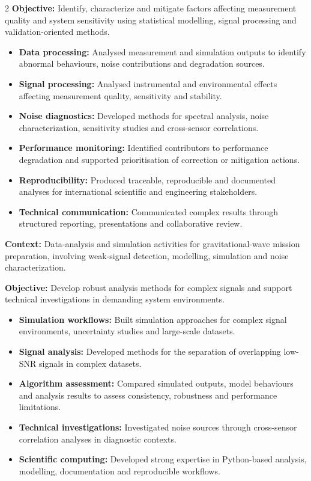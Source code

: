 \documentclass[8pt,a4paper,ragged2e,withhyper]{altacv}
\begin{document}
\begin{paracol}{2}
\textbf{Objective:} Identify, characterize and mitigate factors affecting measurement quality and system sensitivity using statistical modelling, signal processing and validation-oriented methods.

\begin{itemize}
  \item \textbf{Data processing:} Analysed measurement and simulation outputs to identify abnormal behaviours, noise contributions and degradation sources.
  \item \textbf{Signal processing:} Analysed instrumental and environmental effects affecting measurement quality, sensitivity and stability.
  \item \textbf{Noise diagnostics:} Developed methods for spectral analysis, noise characterization, sensitivity studies and cross-sensor correlations.
  \item \textbf{Performance monitoring:} Identified contributors to performance degradation and supported prioritisation of correction or mitigation actions.
  \item \textbf{Reproducibility:} Produced traceable, reproducible and documented analyses for international scientific and engineering stakeholders.
  \item \textbf{Technical communication:} Communicated complex results through structured reporting, presentations and collaborative review.
\end{itemize}

\divider


\textbf{Context:} Data-analysis and simulation activities for gravitational-wave mission preparation, involving weak-signal detection, modelling, simulation and noise characterization.

\textbf{Objective:} Develop robust analysis methods for complex signals and support technical investigations in demanding system environments.

\begin{itemize}
  \item \textbf{Simulation workflows:} Built simulation approaches for complex signal environments, uncertainty studies and large-scale datasets.
  \item \textbf{Signal analysis:} Developed methods for the separation of overlapping low-SNR signals in complex datasets.
  \item \textbf{Algorithm assessment:} Compared simulated outputs, model behaviours and analysis results to assess consistency, robustness and performance limitations.
  \item \textbf{Technical investigations:} Investigated noise sources through cross-sensor correlation analyses in diagnostic contexts.
  \item \textbf{Scientific computing:} Developed strong expertise in Python-based analysis, modelling, documentation and reproducible workflows.
\end{itemize}


\end{paracol}
\end{document}
